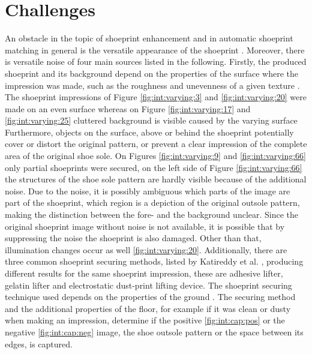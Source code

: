 \documentclass[draft,final]{vutinfth} %
\begin{document}
\section{Challenges}
\par
An obstacle in the topic of shoeprint enhancement and in automatic shoeprint matching in general is the versatile appearance of the shoeprint \cite{kong2017cross}.
Moreover, there is versatile noise of  four main sources  listed in the following.
Firstly, the produced shoeprint and its background depend on the properties of the surface where the impression was made, such as the roughness and unevenness of a given texture \cite{shor2018inherent}.
The shoeprint impressions of Figure \ref{fig:int:varying:3} and \ref{fig:int:varying:20} were made on an even surface whereas on Figure \ref{fig:int:varying:17} and \ref{fig:int:varying:25} cluttered background is visible caused by the varying surface
Furthermore, objects on the surface, above or behind the shoeprint potentially cover or distort the original pattern, or prevent a clear impression of the complete area of the original shoe sole.
On Figures \ref{fig:int:varying:9} and \ref{fig:int:varying:66} only partial shoeprints were secured, on the left side of Figure \ref{fig:int:varying:66} the structures of the shoe sole pattern are hardly visible because of the additional noise.
Due to the noise, it is possibly ambiguous which parts of the image are part of the shoeprint, which region is a depiction of the original outsole pattern, making the distinction between the fore- and the background unclear.
Since the original shoeprint image without noise is not available, it is possible that by suppressing the noise the shoeprint is also damaged.
Other than that, illumination changes occur as well \ref{fig:int:varying:20}.
Additionally, there are three common shoeprint securing methods, listed by Katireddy et al. \cite{katireddy2017novel}, producing different results for the same shoeprint impression, these are adhesive lifter, gelatin lifter and electrostatic dust-print lifting device. 
The shoeprint securing technique used depends on the properties of the ground  \cite{katireddy2017novel}. 
The securing method and the additional properties of the floor, for example if it was clean or dusty when making an impression, determine if the positive \ref{fig:int:cap:pos} or the negative \ref{fig:int:cap:neg} image, the shoe outsole pattern or the space between its edges, is captured.
\end{document}
